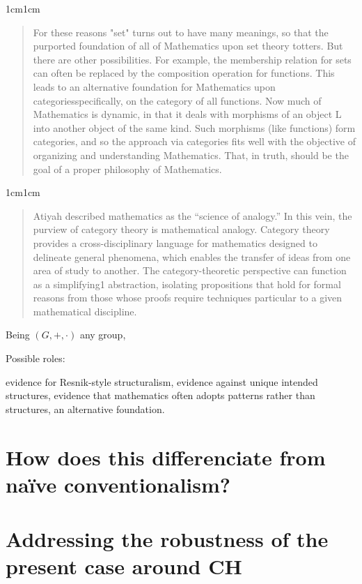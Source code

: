 \documentclass[11pt,a4paper]{book}
\theoremstyle{plain}
\begin{document}
\begin{adjustwidth}{1cm}{1cm}
  \small
  \begin{quote}
For these reasons "set" turns out to have many meanings, so that the purported foundation of all of Mathematics upon set theory totters. But there are other possibilities. For example, the membership relation for sets can often be replaced by the composition operation for functions. This leads to an alternative foundation for Mathematics upon categoriesspecifically, on the category of all functions. Now much of Mathematics is dynamic, in that it deals with morphisms of an object L into another object of the same kind. Such morphisms (like functions) form categories, and so the approach via categories fits well with the objective of organizing and understanding Mathematics. That, in truth, should be the goal of a proper philosophy of Mathematics. \textcite[359]{maclane1986mathematics}
  \end{quote}
\end{adjustwidth}

\begin{adjustwidth}{1cm}{1cm}
  \small
  \begin{quote}
Atiyah described mathematics as the “science of analogy.” In this vein, the purview of category theory is mathematical analogy. Category theory provides a cross-disciplinary language for mathematics designed to delineate general phenomena, which enables the transfer of ideas from one area of study to another. The category-theoretic perspective can function as a simplifying1 abstraction, isolating propositions that hold for formal reasons from those whose proofs require techniques particular to a given mathematical discipline. \parencite[ix]{Riehl2014Category}
  \end{quote}
\end{adjustwidth}

Being $(G, +, \cdot)$ any group,  

Possible roles:

evidence for Resnik-style structuralism,
evidence against unique intended structures,
evidence that mathematics often adopts patterns rather than structures,
an alternative foundation.


\section{How does this differenciate from naïve conventionalism?}

\section{Addressing the robustness of the present case around CH}
\end{document}
